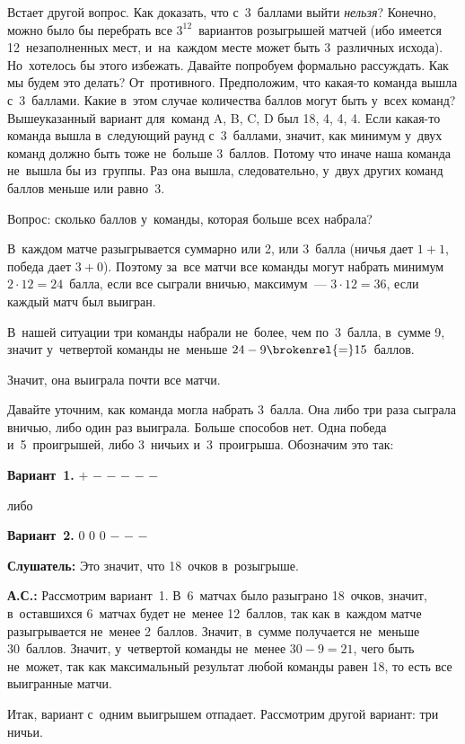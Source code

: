 Встает другой вопрос. Как доказать, что с~3~баллами выйти \textit{нельзя}? Конечно, можно было бы
перебрать все $3^{12}$~вариантов розыгрышей матчей (ибо имеется 12~незаполненных мест, и~на~каждом месте
может быть 3~различных исхода). Но~хотелось бы этого избежать. Давайте попробуем формально
рассуждать. Как мы будем это делать? От~противного. Предположим, что какая-то команда вышла с~3~баллами.
Какие в~этом случае количества баллов могут быть у~всех команд? Вышеуказанный вариант
для~команд A, B, C, D был 18, 4, 4, 4. Если какая-то команда вышла в~следующий раунд с~3~баллами,
значит, как минимум у~двух команд должно быть тоже не~больше 3~баллов. Потому что иначе наша
команда не~вышла бы из~группы. Раз она вышла, следовательно, у~двух других команд баллов меньше или
равно~3.

Вопрос: сколько баллов у~команды, которая больше всех на\-брала?

\pagebreak

В~каждом матче разыгрывается суммарно или 2, или 3~балла (ничья дает $1+1$, победа дает $3+0$). Поэтому
за~все матчи все команды могут набрать минимум $2\cdot12=24$~балла, если все сыграли вничью, максимум~---
$3\cdot12=36$, если каждый матч был выигран.

В~нашей ситуации три команды набрали не~более, чем по~3~балла, в~сумме 9, значит у~четвертой
команды не~меньше $24-9\brokenrel{=}15$~баллов.

Значит, она выиграла почти все матчи.

Давайте уточним, как команда могла набрать 3~балла. Она либо три раза сыграла вничью, либо один раз
выиграла. Больше способов нет. Одна победа и~5~проигрышей, либо 3~ничьих и~3~проигрыша. Обозначим это
так:

\textbf{Вариант~1.} $+$ $-$ $-$ $-$ $-$ $-$

либо

\textbf{Вариант~2.} $0$ $0$ $0$ $-$ $-$ $-$

\textbf{Слушатель:} Это значит, что 18~очков в~розыгрыше.

\textbf{А.С.:} Рассмотрим вариант~1. В~6~матчах было разыграно 18~очков, значит, в~оставшихся
6~матчах будет не~менее 12~баллов, так как в~каждом матче разыгрывается не~менее 2~баллов.
 Значит,
в~сумме получается не~меньше 30~баллов. Значит, у~четвертой команды не~менее $30-9=21$, чего быть
не~может, так как максимальный результат любой команды равен 18, то есть все выигранные матчи.

Итак, вариант с~одним выигрышем отпадает. Рассмотрим другой вариант: три ничьи.

